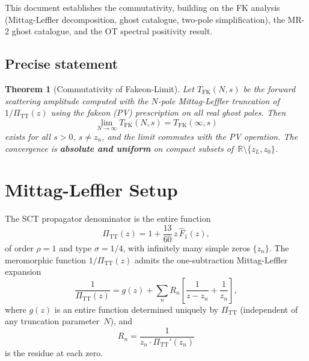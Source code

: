 \documentclass[11pt,a4paper]{article}
\newcommand{\PiTT}{\Pi_{\mathrm{TT}}}
\newcommand{\Fhat}{\hat{F}}
\newtheorem{theorem}{Theorem}[section]
\begin{document}
This document establishes the commutativity, building on the FK analysis
(Mittag-Leffler decomposition, ghost catalogue, two-pole simplification),
the MR-2 ghost catalogue, and the OT spectral positivity result.

\subsection{Precise statement}

\begin{theorem}[Commutativity of Fakeon-Limit]
\label{thm:main}
Let $T_{\mathrm{FK}}(N,s)$ be the forward scattering amplitude computed
with the $N$-pole Mittag-Leffler truncation of\/ $1/\PiTT(z)$ using the
fakeon (PV) prescription on all real ghost poles.  Then
\begin{equation}\label{eq:main}
  \lim_{N\to\infty} T_{\mathrm{FK}}(N,s)
  = T_{\mathrm{FK}}(\infty,s)
\end{equation}
exists for all $s > 0$, $s \neq z_n$, and the limit commutes with the PV
operation.  The convergence is \textbf{absolute and uniform} on compact
subsets of~$\mathbb{R}\setminus\{z_L, z_0\}$.
\end{theorem}


\section{Mittag-Leffler Setup}
\label{sec:ML}

The SCT propagator denominator is the entire function
\begin{equation}\label{eq:PiTT}
  \PiTT(z) = 1 + \frac{13}{60}\,z\,\Fhat_1(z),
\end{equation}
of order $\rho = 1$ and type $\sigma = 1/4$, with infinitely many simple
zeros $\{z_n\}$.  The meromorphic function $1/\PiTT(z)$ admits the
one-subtraction Mittag-Leffler expansion
\begin{equation}\label{eq:ML}
  \frac{1}{\PiTT(z)}
  = g(z) + \sum_n R_n \left[\frac{1}{z - z_n} + \frac{1}{z_n}\right],
\end{equation}
where $g(z)$ is an entire function determined uniquely by $\PiTT$
(independent of any truncation parameter~$N$), and
\begin{equation}\label{eq:residue}
  R_n = \frac{1}{z_n \cdot \PiTT'(z_n)}
\end{equation}
is the residue at each zero.
\end{document}
